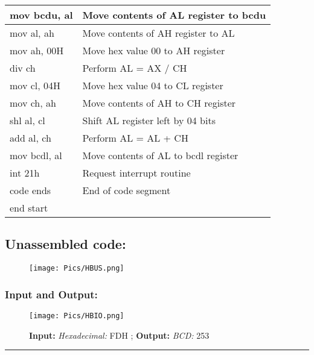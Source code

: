 \documentclass[12pt,a4paper]{article}
\begin{document}
\begin{flushleft}
\begin{table}[htb]
{\begin{tabular}{|l|l|}
\hline         
mov bcdu, al                                                     & Move contents of AL register to bcdu          \\
\hline
mov al, ah                                                       & Move contents of AH register to AL            \\
\hline
mov ah, 00H                                                      & Move hex value 00 to AH register              \\
\hline
div ch                                                           & Perform AL = AX / CH                          \\
\hline
mov cl, 04H                                                      & Move hex value 04 to CL register              \\
\hline
mov ch, ah                                                       & Move contents of AH to CH register            \\
\hline
shl al, cl                                                       & Shift AL register left by 04 bits             \\
\hline
add al, ch                                                       & Perform AL = AL + CH                          \\
\hline
mov bcdl, al                                                     & Move contents of AL to bcdl register          \\
\hline
int 21h                                                          & Request interrupt routine                     \\ 
\hline
code ends                                                        & End of code segment                           \\
\hline
end start                                                        &                                               \\
\hline
\end{tabular}
}
\end{table}

\newpage
\subsection*{\textbf{Unassembled code:}}
\begin{figure}[h]
    \centering
    \texttt{[image: Pics/HBUS.png]}
\end{figure}
\subsubsection*{\textbf{Input and Output:}}
\begin{figure}[h]
    \centering
    \texttt{[image: Pics/HBIO.png]}
    \caption{ \textbf{Input:} \emph{Hexadecimal:} FDH ; \newline \hspace{1cm}
              \textbf{Output:} \emph{BCD:} 253}
\end{figure}
\hrule

\end{flushleft}
\end{document}
